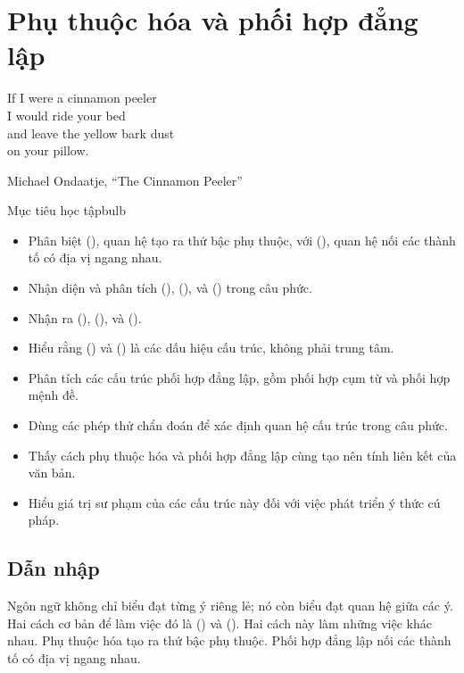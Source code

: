 \chapter{Phụ thuộc hóa và phối hợp đẳng lập} \label{ch:subord-coord-vi}

\epigraph{If I were a cinnamon peeler\\
I would ride your bed\\
and leave the yellow bark dust\\
on your pillow.}{Michael Ondaatje, \enquote{The Cinnamon Peeler}}

\begin{tblsframedsymbol}{Mục tiêu học tập}{bulb}
\begin{itemize}[noitemsep, leftmargin=*]
    \item Phân biệt  (), quan hệ tạo ra thứ bậc phụ thuộc, với  (), quan hệ nối các thành tố có địa vị ngang nhau.
    \item Nhận diện và phân tích  (),  (), và  () trong câu phức.
    \item Nhận ra  (),  (), và  ().
    \item Hiểu rằng  () và  () là các dấu hiệu cấu trúc, không phải trung tâm.
    \item Phân tích các cấu trúc phối hợp đẳng lập, gồm phối hợp cụm từ và phối hợp mệnh đề.
    \item Dùng các phép thử chẩn đoán để xác định quan hệ cấu trúc trong câu phức.
    \item Thấy cách phụ thuộc hóa và phối hợp đẳng lập cùng tạo nên tính liên kết của văn bản.
    \item Hiểu giá trị sư phạm của các cấu trúc này đối với việc phát triển ý thức cú pháp.
\end{itemize}
\end{tblsframedsymbol}

\section{Dẫn nhập}

Ngôn ngữ không chỉ biểu đạt từng ý riêng lẻ; nó còn biểu đạt quan hệ giữa các ý. Hai cách cơ bản để làm việc đó là  () và  (). Hai cách này làm những việc khác nhau. Phụ thuộc hóa tạo ra thứ bậc phụ thuộc. Phối hợp đẳng lập nối các thành tố có địa vị ngang nhau.

